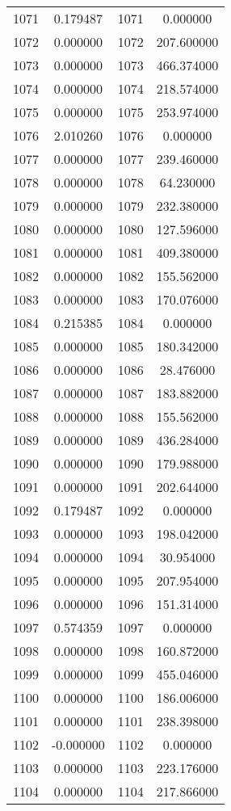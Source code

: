 \documentclass[12pt]{article}
\begin{document}
\begin{longtable}{@{}cccc@{}}
1071 & 0.179487 & 1071 & 0.000000 \\
1072 & 0.000000 & 1072 & 207.600000 \\
1073 & 0.000000 & 1073 & 466.374000 \\
1074 & 0.000000 & 1074 & 218.574000 \\
1075 & 0.000000 & 1075 & 253.974000 \\
1076 & 2.010260 & 1076 & 0.000000 \\
1077 & 0.000000 & 1077 & 239.460000 \\
1078 & 0.000000 & 1078 & 64.230000 \\
1079 & 0.000000 & 1079 & 232.380000 \\
1080 & 0.000000 & 1080 & 127.596000 \\
1081 & 0.000000 & 1081 & 409.380000 \\
1082 & 0.000000 & 1082 & 155.562000 \\
1083 & 0.000000 & 1083 & 170.076000 \\
1084 & 0.215385 & 1084 & 0.000000 \\
1085 & 0.000000 & 1085 & 180.342000 \\
1086 & 0.000000 & 1086 & 28.476000 \\
1087 & 0.000000 & 1087 & 183.882000 \\
1088 & 0.000000 & 1088 & 155.562000 \\
1089 & 0.000000 & 1089 & 436.284000 \\
1090 & 0.000000 & 1090 & 179.988000 \\
1091 & 0.000000 & 1091 & 202.644000 \\
1092 & 0.179487 & 1092 & 0.000000 \\
1093 & 0.000000 & 1093 & 198.042000 \\
1094 & 0.000000 & 1094 & 30.954000 \\
1095 & 0.000000 & 1095 & 207.954000 \\
1096 & 0.000000 & 1096 & 151.314000 \\
1097 & 0.574359 & 1097 & 0.000000 \\
1098 & 0.000000 & 1098 & 160.872000 \\
1099 & 0.000000 & 1099 & 455.046000 \\
1100 & 0.000000 & 1100 & 186.006000 \\
1101 & 0.000000 & 1101 & 238.398000 \\
1102 & -0.000000 & 1102 & 0.000000 \\
1103 & 0.000000 & 1103 & 223.176000 \\
1104 & 0.000000 & 1104 & 217.866000 \\

\end{longtable}
\end{document}
